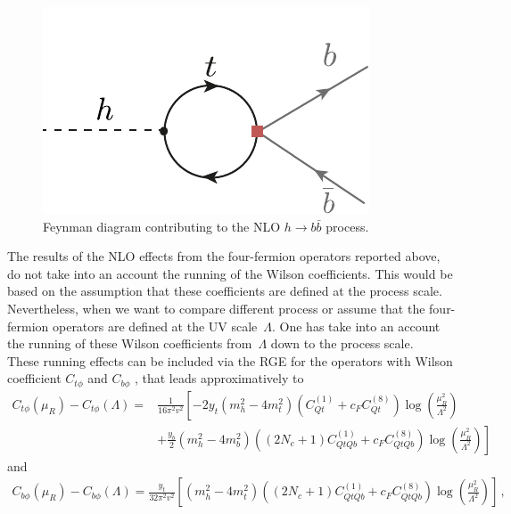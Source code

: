 \begin{figure}[h!]
	\centering
	\includegraphics[scale=0.8]{./figures/Hbb}
	\caption{Feynman diagram contributing to the NLO   $h \to b \bar b$ process. }
	\label{hbb}
\end{figure}
The results of the NLO effects from the four-fermion operators reported above, do not take into an account the running of the Wilson coefficients. This would be based on the assumption that these coefficients are defined at the process scale. Nevertheless, when we want to compare different process or assume that the four-fermion operators are defined at the UV scale~$\Lambda$. One has take into an account the running of these Wilson coefficients from~$\Lambda$ down to the process scale.\\
These running effects can be included via the RGE for the operators with Wilson coefficient $C_{t\phi}$  and $C_{b\phi}$  \cite{Jenkins:2013zja, Jenkins:2013wua}, that leads approximatively to 
\begin{equation}
	\begin{split}
			C_{t\phi}(\mu_R)-C_{t\phi}(\Lambda)= &\frac{1}{16 \pi^2 v^2} \left[-2  y_t (m_h^2  -4 m_t^2) (C_{Qt}^{(1)}+c_F C_{Qt}^{(8)} )\log\left( \frac{\mu_R^2}{\Lambda^2}\right) \right.\\
			& \left.+ \frac{y_b}{2} (m_h^2-4 m_b^2)\left(  (2N_c+1)  C_{QtQb}^{(1)}+   c_F C_{QtQb}^{(8)}\right)\log\left( \frac{\mu_R^2}{\Lambda^2}\right)\right] \label{eq:runningCuH}
		\end{split}
\end{equation}
and
\begin{equation}
	\begin{split}
			C_{b\phi}(\mu_R)-C_{b\phi}(\Lambda)= \frac{y_t}{32 \pi^2 v^2} \left[  (m_h^2-4 m_t^2)\left(  (2N_c+1)  C_{QtQb}^{(1)}+   c_F C_{QtQb}^{(8)}\right)\log\left( \frac{\mu_R^2}{\Lambda^2}\right)\right]\,, \label{eq:runningCdH}
		\end{split}
\end{equation}

